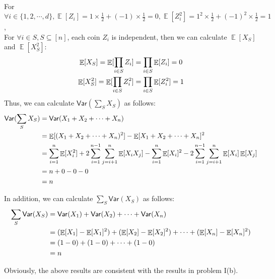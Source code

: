\documentclass[12pt]{article}
\DeclareMathOperator*{\E}{\mathbb{E}}
\newcommand{\Var}{\mathsf{Var}}
\begin{document}
\begin{problem}[30 points]
\begin{enumerate}[(a)]
For $\forall i \in \{1, 2, \cdots, d\}, \E[Z_i] = 1 \times \frac{1}{2} + (-1) \times \frac{1}{2} = 0, \E[Z_i^2] = 1^2 \times \frac{1}{2} + (-1)^2 \times \frac{1}{2} = 1$, \\
For $\forall i \in S, S \subseteq [n]$, each coin $Z_i$ is independent, then we can calculate $\E[X_S]$ and $\E[X_S^2]$:
\begin{gather*}
\E[X_S] = \E[\prod_{i \in S}Z_i] = \prod_{i \in S}\E[Z_i] = 0 \notag \\
\E[X_S^2] = \E[\prod_{i \in S}Z_i^2] = \prod_{i \in S}\E[Z_i^2] = 1 \notag \\
\end{gather*}
Thus, we can calculate $\Var(\sum_{S}X_S)$ as follows:
\begin{equation}
\begin{aligned}
\Var(\sum_{S}X_S) &= \Var(X_1 + X_2 + \cdots + X_n) \notag \\
&= \E[(X_1 + X_2 + \cdots + X_n)^2] - \E[X_1 + X_2 + \cdots + X_n]^2 \\
&= \sum_{i=1}^n\E[X_i^2] + 2\sum_{i=1}^{n-1}\sum_{j=i+1}^{n}\E[X_iX_j] - \sum_{i=1}^n\E[X_i]^2 - 2\sum_{i=1}^{n-1}\sum_{j=i+1}^{n}\E[X_i]\E[X_j] \\
&= n + 0 - 0 - 0 \\
&= n
\end{aligned}
\end{equation}

In addition, we can calculate $\sum_{S}\Var(X_S)$ as follows:
\begin{equation}
\begin{aligned}
\sum_{S}\Var(X_S) &= \Var(X_1) + \Var(X_2) + \cdots + \Var(X_n) \notag \\
&= (\E[X_1] - \E[X_1]^2) + (\E[X_2] - \E[X_2]^2) + \cdots + (\E[X_n] - \E[X_n]^2) \\
&= (1 - 0) + (1 - 0) + \cdots + (1 - 0) \\
&= n
\end{aligned}
\end{equation}

Obviously, the above results are consistent with the results in problem I(b).

\end{enumerate}
\end{problem}
\end{document}
